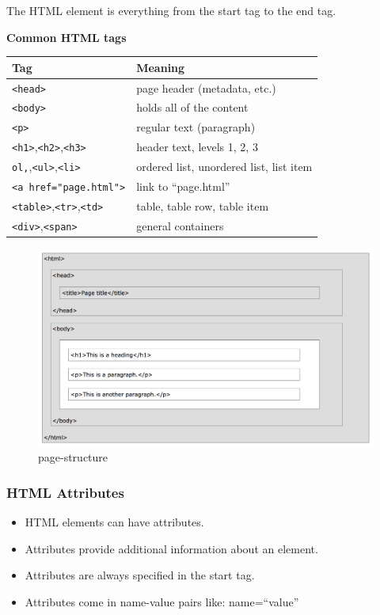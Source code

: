 \documentclass[
]{book}
\providecommand{\tightlist}{%
  \setlength{\itemsep}{0pt}\setlength{\parskip}{0pt}}
\begin{document}
The HTML element is everything from the start tag to the end tag.

\textbf{Common HTML tags}

\begin{longtable}[]{@{}ll@{}}
\toprule
Tag & Meaning\tabularnewline
\midrule
\endhead
\texttt{\textless{}head\textgreater{}} & page header (metadata, etc.)\tabularnewline
\texttt{\textless{}body\textgreater{}} & holds all of the content\tabularnewline
\texttt{\textless{}p\textgreater{}} & regular text (paragraph)\tabularnewline
\texttt{\textless{}h1\textgreater{}},\texttt{\textless{}h2\textgreater{}},\texttt{\textless{}h3\textgreater{}} & header text, levels 1, 2, 3\tabularnewline
\texttt{ol,},\texttt{\textless{}ul\textgreater{}},\texttt{\textless{}li\textgreater{}} & ordered list, unordered list, list item\tabularnewline
\texttt{\textless{}a\ href="page.html"\textgreater{}} & link to ``page.html''\tabularnewline
\texttt{\textless{}table\textgreater{}},\texttt{\textless{}tr\textgreater{}},\texttt{\textless{}td\textgreater{}} & table, table row, table item\tabularnewline
\texttt{\textless{}div\textgreater{}},\texttt{\textless{}span\textgreater{}} & general containers\tabularnewline
\bottomrule
\end{longtable}

\begin{figure}
\centering
\includegraphics{img/page-structure.png}
\caption{page-structure}
\end{figure}

\hypertarget{html-attributes}{%
\subsubsection{HTML Attributes}\label{html-attributes}}

\begin{itemize}
\tightlist
\item
  HTML elements can have attributes.
\item
  Attributes provide additional information about an element.
\item
  Attributes are always specified in the start tag.
\item
  Attributes come in name-value pairs like: name=``value''
\end{itemize}
\end{document}
